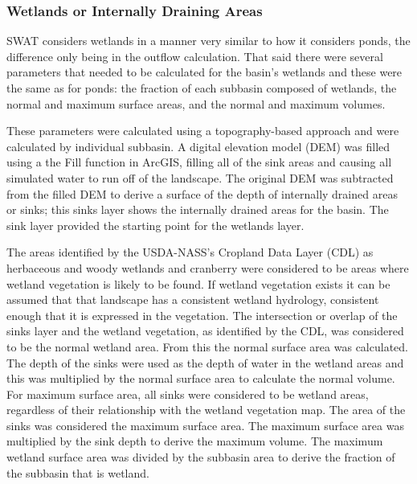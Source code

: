 \subsubsection{Wetlands or Internally Draining Areas}

	SWAT considers wetlands in a manner very similar to how it considers ponds, the difference only being in the outflow calculation. That said there were several parameters that needed to be calculated for the basin's wetlands and these were the same as for ponds: the fraction of each subbasin composed of wetlands, the normal and maximum surface areas, and the normal and maximum volumes. 
	
	These parameters were calculated using a topography-based approach and were calculated by individual subbasin. A digital elevation model (DEM) was filled using a the Fill function in ArcGIS, filling all of the sink areas and causing all simulated water to run off of the landscape. The original DEM was subtracted from the filled DEM to derive a surface of the depth of internally drained areas or sinks; this sinks layer shows the internally drained areas for the basin. The sink layer provided the starting point for the wetlands layer. 
	
	The areas identified by the USDA-NASS's Cropland Data Layer (CDL) as herbaceous and woody wetlands and cranberry were considered to be areas where wetland vegetation is likely to be found. If wetland vegetation exists it can be assumed that that landscape has a consistent wetland hydrology, consistent enough that it is expressed in the vegetation. The intersection or overlap of the sinks layer and the wetland vegetation, as identified by the CDL, was considered to be the normal wetland area. From this the normal surface area was calculated. The depth of the sinks were used as the depth of water in the wetland areas and this was multiplied by the normal surface area to calculate the normal volume. For maximum surface area, all sinks were considered to be wetland areas, regardless of their relationship with the wetland vegetation map. The area of the sinks was considered the maximum surface area. The maximum surface area was multiplied by the sink depth to derive the maximum volume. The maximum wetland surface area was divided by the subbasin area to derive the fraction of the subbasin that is wetland.
	
